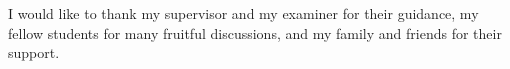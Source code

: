 

I would like to thank my supervisor and my examiner for their guidance, my fellow students for many
fruitful discussions, and my family and friends for their support.
